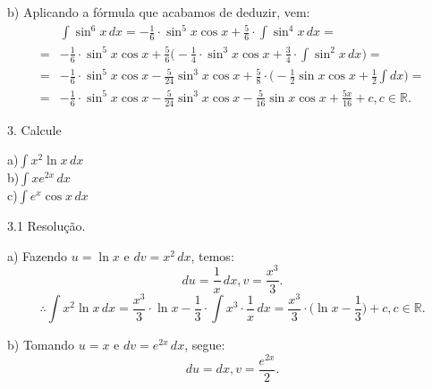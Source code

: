\documentclass{article}
\begin{document}
{\begin{newpage}
\par
\vspace{0.3cm}
b) Aplicando a fórmula que acabamos de deduzir, vem:
\begin{equation*} \displaystyle{\begin{split} &\int\sin^{6}{x}\, dx = -\frac{1}{6}\cdot\sin^{5}{x}\cos{x} + \frac{5}{6}\cdot\int\sin^{4}{x}\, dx = \\ = &-\frac{1}{6}\cdot\sin^{5}{x}\cos{x} + \frac{5}{6}\Big(-\frac{1}{4}\cdot\sin^{3}{x}\cos{x} + \frac{3}{4}\cdot\int\sin^{2}{x}\, dx\Big) = \\ = &-\frac{1}{6}\cdot\sin^{5}{x}\cos{x} - \frac{5}{24}\sin^{3}{x}\cos{x}+\frac{5}{8}\cdot\Big(-\frac{1}{2}\sin{x}\cos{x} + \frac{1}{2}\int dx\Big) = \\ = &-\frac{1}{6}\cdot\sin^{5}{x}\cos{x} - \frac{5}{24}\sin^{3}{x}\cos{x} - \frac{5}{16}\sin{x}\cos{x} + \frac{5x}{16} + c, c\in\mathbb{R}
.\end{split}}\end{equation*}
\par
\vspace{0.3cm}
\begin{flushleft}
3. Calcule
\end{flushleft}
\par
\begin{multicols}{3}
\hspace{-15pt}a)$\displaystyle{\int x^{2}\ln{x}\, dx}$\\
b)$\displaystyle{\int xe^{2x}\, dx}$\\
c)$\displaystyle{\int e^{x}\cos{x}\, dx}$
\end{multicols}
\par
\vspace{0.3cm}
\begin{flushleft}
3.1 Resolução.
\end{flushleft}
\par a) Fazendo $u = \ln{x}$ e $dv = x^{2}\, dx$, temos:
\begin{equation*} \displaystyle{du = \frac{1}{x}\, dx, v = \frac{x^3}{3}}.\end{equation*}
$$\displaystyle{\therefore \int x^{2}\ln{x}\, dx = \frac{x^3}{3}\cdot\ln{x} - \frac{1}{3}\cdot\int x^{3}\cdot\frac{1}{x}\, dx = \frac{x^3}{3}\cdot \Big(\ln{x} - \frac{1}{3}\Big) + c, c\in\mathbb{R}.}$$
\par
\vspace{0.3cm}
b) Tomando $u = x$ e $dv = e^{2x}\, dx$, segue:
\begin{equation*} du = dx, v = \displaystyle{\frac{e^{2x}}{2}}.\end{equation*}

\end{newpage}}
\end{document}
